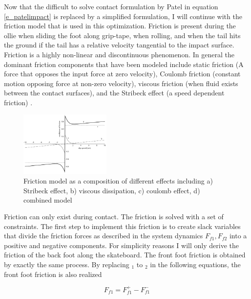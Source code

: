 \documentclass[default,iicol]{sn-jnl}
\theoremstyle{thmstyleone}%
\theoremstyle{thmstyletwo}%
\theoremstyle{thmstylethree}%
\begin{document}
Now that the difficult to solve contact formulation by Patel in equation \ref{e_patelimpact} is replaced by a simplified formulation, I will continue with the friction model that is used in this optimization.
Friction is present during the ollie when sliding the foot along grip-tape, when rolling, and when the tail hits the ground if the tail has a relative velocity tangential to the impact surface. Friction is a highly non-linear and discontinuous phenomenon. In general the dominant friction components that have been modeled include static friction (A force that opposes the input force at zero velocity), Coulomb friction (constant motion opposing force at non-zero velocity), viscous friction (when fluid exists between the contact surfaces), and the Stribeck effect (a speed dependent friction) \cite{makkar_new_2005}. 
\begin{figure}
    \centering
    \includegraphics[width=0.4\textwidth]{figure/friction_.png}
    \caption[Friction effects]{Friction model as a composition of different effects including a) Stribeck effect, b) viscous dissipation, c) coulomb effect, d) combined model}
    \label{f_friction}
\end{figure}

Friction can only exist during contact. The friction is solved with a set of constraints. The first step to implement this friction is to create slack variables that divide the friction forces as described in the system dynamics $F_{f1},F_{f2}$ into a positive and negative components. For simplicity reasons I will only derive the friction of the back foot along the skateboard. The front foot friction is obtained by exactly the same process. By replacing $_1$ to $_2$ in the following equations, the front foot friction is also realized

\begin{equation} \label{e_plusminfric}
   F_{f1} = F_{f1}^+ - F_{f1}^- 
\end{equation}
\end{document}
